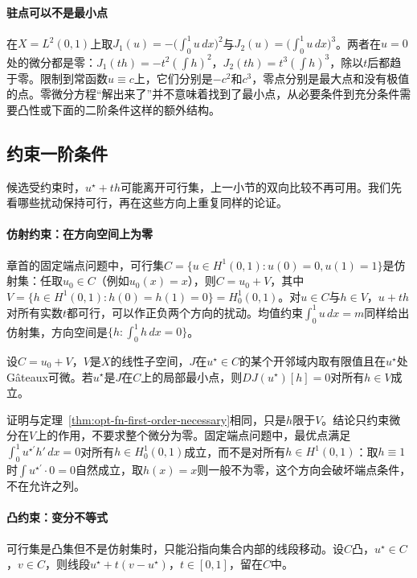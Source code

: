 \paragraph{驻点可以不是最小点}
在$X=L^2(0,1)$上取$J_1(u)=-\bigl(\int_0^1u\,dx\bigr)^2$与$J_2(u)=\bigl(\int_0^1u\,dx\bigr)^3$。两者在$u=0$处的微分都是零：$J_1(th)=-t^2(\int h)^2$，$J_2(th)=t^3(\int h)^3$，除以$t$后都趋于零。限制到常函数$u\equiv c$上，它们分别是$-c^2$和$c^3$，零点分别是最大点和没有极值的点。零微分方程“解出来了”并不意味着找到了最小点，从必要条件到充分条件需要凸性或下面的二阶条件这样的额外结构。

\subsection{约束一阶条件}
\label{sec:opt-fn-constrained-first}

候选受约束时，$u^\star+th$可能离开可行集，上一小节的双向比较不再可用。我们先看哪些扰动保持可行，再在这些方向上重复同样的论证。

\paragraph{仿射约束：在方向空间上为零}
章首的固定端点问题中，可行集$C=\{u\in H^1(0,1):u(0)=0,u(1)=1\}$是仿射集：任取$u_0\in C$（例如$u_0(x)=x$），则$C=u_0+V$，其中$V=\{h\in H^1(0,1):h(0)=h(1)=0\}=H_0^1(0,1)$。对$u\in C$与$h\in V$，$u+th$对所有实数$t$都可行，可以作正负两个方向的扰动。均值约束$\int_0^1u\,dx=m$同样给出仿射集，方向空间是$\{h:\int_0^1h\,dx=0\}$。

\begin{theorem}[仿射约束下的一阶必要条件]
\label{thm:opt-fn-affine-first-order}
设$C=u_0+V$，$V$是$X$的线性子空间，$J$在$u^\star\in C$的某个开邻域内取有限值且在$u^\star$处Gâteaux可微。若$u^\star$是$J$在$C$上的局部最小点，则$DJ(u^\star)[h]=0$对所有$h\in V$成立。
\end{theorem}

证明与定理~\ref{thm:opt-fn-first-order-necessary}相同，只是$h$限于$V$。结论只约束微分在$V$上的作用，不要求整个微分为零。固定端点问题中，最优点满足$\int_0^1u^{\star\prime}h'\,dx=0$对所有$h\in H_0^1(0,1)$成立，而不是对所有$h\in H^1(0,1)$：取$h\equiv1$时$\int u^{\star\prime}\cdot0=0$自然成立，取$h(x)=x$则一般不为零，这个方向会破坏端点条件，不在允许之列。

\paragraph{凸约束：变分不等式}
可行集是凸集但不是仿射集时，只能沿指向集合内部的线段移动。设$C$凸，$u^\star\in C$，$v\in C$，则线段$u^\star+t(v-u^\star)$，$t\in[0,1]$，留在$C$中。

